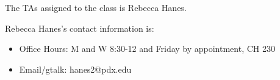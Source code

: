 The TAs assigned to the class is Rebecca Hanes. 


Rebecca Hanes's contact information is:
\begin{itemize}
\item Office Hours: M and W 8:30-12 and Friday by appointment, CH 230
\item Email/gtalk: hanes2@pdx.edu 
\end{itemize}

